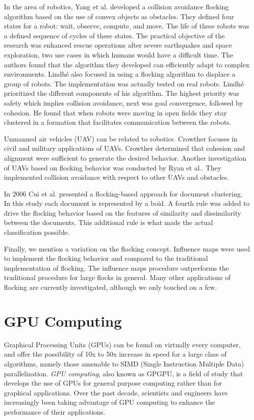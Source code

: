 In the area of robotics, Yang et al.\cite{flockingRobots} developed a collision avoidance flocking algorithm based on the use of convex objects as obstacles. They defined four states for a robot: wait, observe, compute, and move. The life of these robots was a defined sequence of cycles of these states. The practical objective of the research was enhanced rescue operations after severe earthquakes and space exploration, two use cases in which humans would have a difficult time. The authors found that the algorithm they developed can efficiently adapt to complex environments. Lindh\'{e}\cite{flockingRobotsThesis} also focused in using a flocking algorithm to displace a group of robots. The implementation was actually tested on real robots. Lindh\'{e} prioritized the different components of his algorithm. The highest priority was safety which implies collision avoidance, next was goal convergence, followed by cohesion. He found that when robots were moving in open fields they stay clustered in a formation that facilitates communication between the robots. 

Unmanned air vehicles (UAV) can be related to robotics. Crowther\cite{flockingUAV} focuses in civil and military applications of UAVs. Crowther determined that cohesion and alignment were sufficient to generate the desired behavior. Another investigation of UAVs based on flocking behavior was conducted by Ryan et al.\cite{UAVControl}. They implemented collision avoidance with respect to other UAVs and obstacles. 

In 2006 Cui et al.\cite{document1} presented a flocking-based approach for document clustering. In this study each document is represented by a boid. A fourth rule was added to drive the flocking behavior based on the features of similarity and dissimilarity between the documents. This additional rule is what made the actual classification possible. 

Finally, we mention a variation on the flocking concept.  Influence maps were used to implement the flocking behavior and compared to the traditional implementation of flocking\cite{flockingInfluenceMaps}. The influence maps procedure outperforms the traditional procedure for large flocks in general. Many other applications of flocking are currently investigated, although we only touched on a few. 

\section{GPU Computing}
Graphical Processing Units (GPUs) can be found on virtually every computer, and offer the possibility of 10x to 50x increase in speed for a large class of algorithms, namely those amenable to SIMD (Single Instruction Multiple Data)  parallelization. \textit{GPU computing}, also known as GPGPU, is a field of study that develops the use of GPUs for general purpose computing rather than for graphical applications. Over the past decade, scientists and engineers have increasingly been taking advantage of GPU computing to enhance the performance of their applications.

